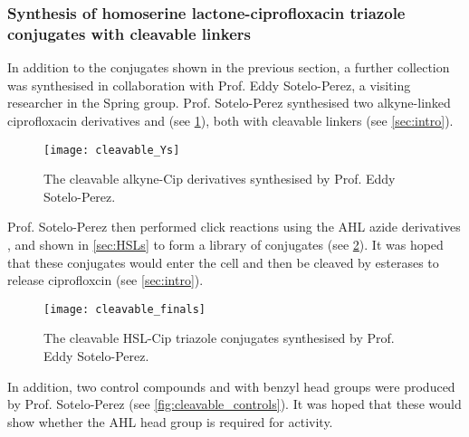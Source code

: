 \subsubsection{Synthesis of homoserine lactone-ciprofloxacin triazole conjugates with cleavable linkers\label{sec:cleavable}}

In addition to the conjugates shown in the previous section, a further collection was synthesised in collaboration with Prof. Eddy Sotelo-Perez, a visiting researcher in the Spring group. Prof. Sotelo-Perez synthesised two alkyne-linked ciprofloxacin derivatives  and  (see \ref{fig:cleavable_Ys}), both with cleavable linkers (see \ref{sec:intro}). 

\begin{figure}[H]
	\begin{center}
		\texttt{[image: cleavable\_Ys]}
		\caption{
			The cleavable alkyne-Cip derivatives synthesised by Prof. Eddy Sotelo-Perez.
			\label{fig:cleavable_Ys}}
	\end{center}
\end{figure}

Prof. Sotelo-Perez then performed click reactions using the AHL azide derivatives ,  and  shown in \ref{sec:HSLs} to form a library of conjugates (see \ref{fig:cleavable_finals}). It was hoped that these conjugates would enter the cell and then be cleaved by esterases to release ciprofloxcin (see \ref{sec:intro}).

\begin{figure}[H]
	\begin{center}
		\texttt{[image: cleavable\_finals]}
		\caption{
			The cleavable HSL-Cip triazole conjugates synthesised by Prof. Eddy Sotelo-Perez.
			\label{fig:cleavable_finals}}
	\end{center}
\end{figure}

In addition, two control compounds  and  with benzyl head groups were produced by Prof. Sotelo-Perez (see \ref{fig:cleavable_controls}). It was hoped that these would show whether the AHL head group is required for activity.

